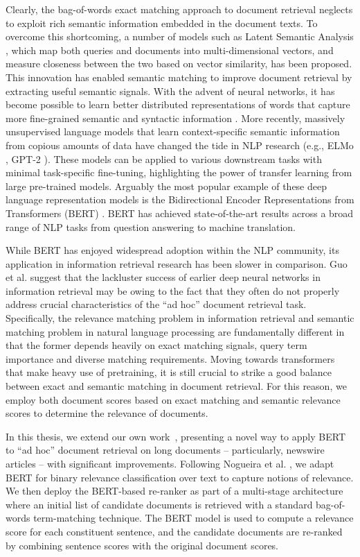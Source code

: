 Clearly, the bag-of-words exact matching approach to document retrieval neglects to exploit rich semantic information embedded in the document texts.
To overcome this shortcoming, a number of models such as Latent Semantic Analysis \cite{deerwester1990indexing}, which map both queries and documents into multi-dimensional vectors, and measure closeness between the two based on vector similarity, has been proposed.
This innovation has enabled semantic matching to improve document retrieval by extracting useful semantic signals.
With the advent of neural networks, it has become possible to learn better distributed representations of words that capture more fine-grained semantic and syntactic information \cite{mikolov2013distributed, pennington2014glove}.
More recently, massively unsupervised language models that learn context-specific semantic information from copious amounts of data have changed the tide in NLP research (e.g., ELMo \cite{peters2018deep}, GPT-2 \cite{radford2019language}).
These models can be applied to various downstream tasks with minimal task-specific fine-tuning, highlighting the power of transfer learning from large pre-trained models.
Arguably the most popular example of these deep language representation models is the Bidirectional Encoder Representations from Transformers (BERT) \cite{devlin2018bert}.
BERT has achieved state-of-the-art results across a broad range of NLP tasks from question answering to machine translation.

While BERT has enjoyed widespread adoption within the NLP community, its application in information retrieval research has been slower in comparison.
Guo et al. \cite{guo2016deep} suggest that the lackluster success of earlier deep neural networks in information retrieval may be owing to the fact that they often do not properly address crucial characteristics of the ``ad hoc'' document retrieval task.
Specifically, the relevance matching problem in information retrieval and semantic matching problem in natural language processing are fundamentally different in that the former depends heavily on exact matching signals, query term importance and diverse matching requirements.
Moving towards transformers that make heavy use of pretraining, it is still crucial to strike a good balance between exact and semantic matching in document retrieval.
For this reason, we employ both document scores based on exact matching and semantic relevance scores to determine the relevance of documents.

In this thesis, we extend our own work~\cite{yilmaz2019cross, yilmaz2019applying}, presenting a novel way to apply BERT to ``ad hoc'' document retrieval on long documents -- particularly, newswire articles -- with significant improvements.
Following Nogueira et al. \cite{nogueira2019passage}, we adapt BERT for binary relevance classification over text to capture notions of relevance.
We then deploy the BERT-based re-ranker as part of a multi-stage architecture where an initial list of candidate documents is retrieved with a standard bag-of-words term-matching technique.
The BERT model is used to compute a relevance score for each constituent sentence, and the candidate documents are re-ranked by combining sentence scores with the original document scores.

